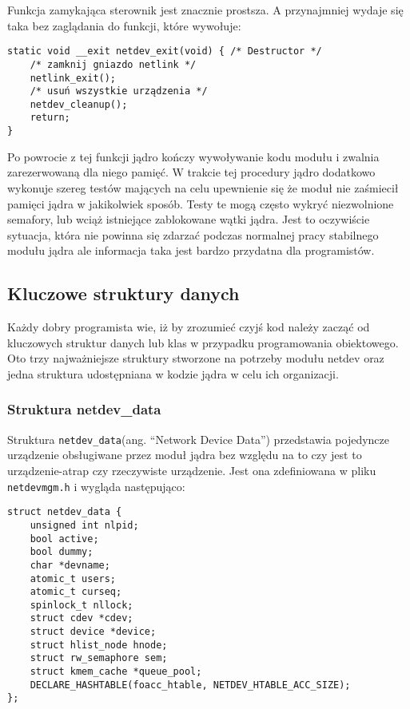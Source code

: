 \documentclass[10pt]{article}
\begin{document}
Funkcja zamykająca sterownik jest znacznie prostsza. A przynajmniej wydaje się taka bez zaglądania do funkcji, które wywołuje:

\begin{verbatim}
static void __exit netdev_exit(void) { /* Destructor */
    /* zamknij gniazdo netlink */
    netlink_exit();
    /* usuń wszystkie urządzenia */
    netdev_cleanup();
    return;
}
\end{verbatim}

Po powrocie z tej funkcji jądro kończy wywoływanie kodu modułu i zwalnia zarezerwowaną dla niego pamięć. W trakcie tej procedury jądro dodatkowo wykonuje szereg testów mających na celu upewnienie się że moduł nie zaśmiecił pamięci jądra w jakikolwiek sposób. Testy te mogą często wykryć niezwolnione semafory, lub wciąż istniejące zablokowane wątki jądra. Jest to oczywiście sytuacja, która nie powinna się zdarzać podczas normalnej pracy stabilnego modułu jądra ale informacja taka jest bardzo przydatna dla programistów.  
\subsection{Kluczowe struktury danych}
\label{mainstructs}

Każdy dobry programista wie, iż by zrozumieć czyjś kod należy zacząć od kluczowych struktur danych lub klas w przypadku programowania obiektowego. Oto trzy najważniejsze struktury stworzone na potrzeby modułu netdev oraz jedna struktura udostępniana w kodzie jądra w celu ich organizacji.

\subsubsection{Struktura netdev\_data}

Struktura \texttt{netdev\_data}(ang. ``Network Device Data'') przedstawia pojedyncze urządzenie obsługiwane przez moduł jądra bez względu na to czy jest to urządzenie-atrap czy rzeczywiste urządzenie.  Jest ona zdefiniowana w pliku \texttt{netdevmgm.h} i wygląda następująco:

\begin{verbatim}
struct netdev_data {
    unsigned int nlpid;
    bool active;
    bool dummy;
    char *devname;
    atomic_t users;
    atomic_t curseq;
    spinlock_t nllock;
    struct cdev *cdev;
    struct device *device;
    struct hlist_node hnode;
    struct rw_semaphore sem;
    struct kmem_cache *queue_pool;
    DECLARE_HASHTABLE(foacc_htable, NETDEV_HTABLE_ACC_SIZE);
};
\end{verbatim}
\end{document}
